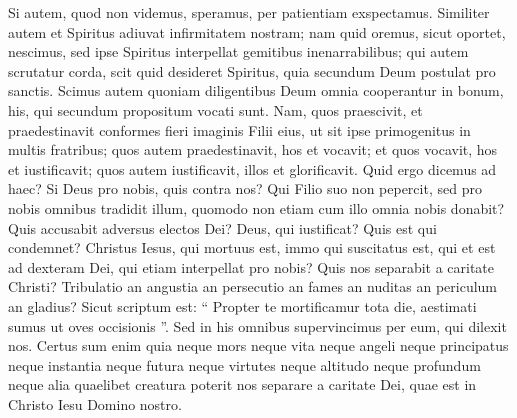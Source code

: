 \begin{biblechapter}
\begin{biblechapter}
\begin{biblechapter}
\begin{biblechapter}
\begin{biblechapter}
\begin{biblechapter}
\begin{biblechapter}
\begin{biblechapter}
\verse Si autem, quod non videmus, speramus, per patientiam exspectamus.
 \verse Similiter autem et Spiritus adiuvat infirmitatem nostram; nam quid oremus, sicut oportet, nescimus, sed ipse Spiritus interpellat gemitibus inenarrabilibus; 
\verse qui autem scrutatur corda, scit quid desideret Spiritus, quia secundum Deum postulat pro sanctis.
 \verse Scimus autem quoniam diligentibus Deum omnia cooperantur in bonum, his, qui secundum propositum vocati sunt. 
\verse Nam, quos praescivit, et praedestinavit conformes fieri imaginis Filii eius, ut sit ipse primogenitus in multis fratribus; 
\verse quos autem praedestinavit, hos et vocavit; et quos vocavit, hos et iustificavit; quos autem iustificavit, illos et glorificavit.
 \verse Quid ergo dicemus ad haec? Si Deus pro nobis, quis contra nos? 
\verse Qui Filio suo non pepercit, sed pro nobis omnibus tradidit illum, quomodo non etiam cum illo omnia nobis donabit? 
\verse Quis accusabit adversus electos Dei? Deus, qui iustificat? 
\verse Quis est qui condemnet? Christus Iesus, qui mortuus est, immo qui suscitatus est, qui et est ad dexteram Dei, qui etiam interpellat pro nobis?
 \verse Quis nos separabit a caritate Christi? Tribulatio an angustia an persecutio an fames an nuditas an periculum an gladius? 
\verse Sicut scriptum est:
 “ Propter te mortificamur tota die,
 aestimati sumus ut oves occisionis ”.
 \verse Sed in his omnibus supervincimus per eum, qui dilexit nos.
 \verse Certus sum enim quia neque mors neque vita neque angeli neque principatus neque instantia neque futura neque virtutes 
\verse neque altitudo neque profundum neque alia quaelibet creatura poterit nos separare a caritate Dei, quae est in Christo Iesu Domino nostro.
 

\end{biblechapter}
\end{biblechapter}
\end{biblechapter}
\end{biblechapter}
\end{biblechapter}
\end{biblechapter}
\end{biblechapter}
\end{biblechapter}
